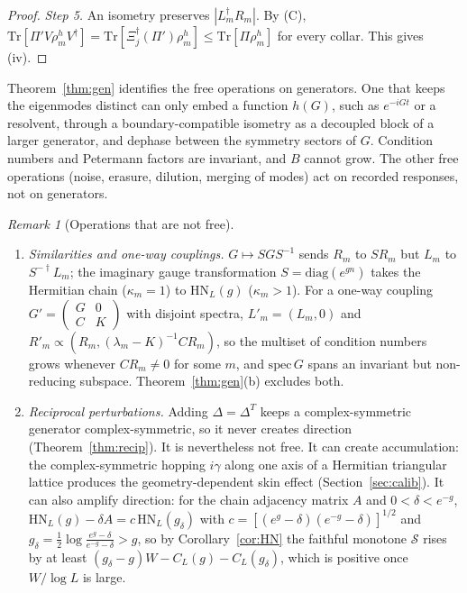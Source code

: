 \documentclass[11pt]{article}
\theoremstyle{definition}
\theoremstyle{remark}
\newtheorem{remark}{Remark}
\newcommand{\Tr}{\mathrm{Tr}}
\begin{document}
\begin{proof}
\emph{Step 5.} An isometry preserves $|L_m^\dagger R_m|$. By (C), $\Tr[\Pi'V\rho^h_mV^\dagger]=\Tr[\Xi_j^\dagger(\Pi')\rho^h_m]\le\Tr[\Pi\rho^h_m]$ for every collar. This gives (iv).
\end{proof}

Theorem~\ref{thm:gen} identifies the free operations on generators. One that keeps the eigenmodes distinct can only embed a function $h(G)$, such as $e^{-iGt}$ or a resolvent, through a boundary-compatible isometry as a decoupled block of a larger generator, and dephase between the symmetry sectors of $G$. Condition numbers and Petermann factors are invariant, and $B$ cannot grow. The other free operations (noise, erasure, dilution, merging of modes) act on recorded responses, not on generators.

\begin{remark}[Operations that are not free]\label{rem:notfree}
\leavevmode
\begin{enumerate}
\item[(a)] \emph{Similarities and one-way couplings.} $G\mapsto SGS^{-1}$ sends $R_m$ to $SR_m$ but $L_m$ to $S^{-\dagger}L_m$; the imaginary gauge transformation $S=\mathrm{diag}(e^{gn})$ takes the Hermitian chain ($\kappa_m=1$) to $\mathrm{HN}_L(g)$ ($\kappa_m>1$). For a one-way coupling $G'=\left(\begin{smallmatrix}G&0\\C&K\end{smallmatrix}\right)$ with disjoint spectra, $L'_m=(L_m,0)$ and $R'_m\propto(R_m,(\lambda_m-K)^{-1}CR_m)$, so the multiset of condition numbers grows whenever $CR_m\ne0$ for some $m$, and $\mathrm{spec}\,G$ spans an invariant but non-reducing subspace. Theorem~\ref{thm:gen}(b) excludes both.
\item[(b)] \emph{Reciprocal perturbations.} Adding $\Delta=\Delta^T$ keeps a complex-symmetric generator complex-symmetric, so it never creates direction (Theorem~\ref{thm:recip}). It is nevertheless not free. It can create accumulation: the complex-symmetric hopping $i\gamma$ along one axis of a Hermitian triangular lattice produces the geometry-dependent skin effect (Section~\ref{sec:calib}). It can also amplify direction: for the chain adjacency matrix $A$ and $0<\delta<e^{-g}$, $\mathrm{HN}_L(g)-\delta A=c\,\mathrm{HN}_L(g_\delta)$ with $c=[(e^g-\delta)(e^{-g}-\delta)]^{1/2}$ and $g_\delta=\frac12\log\frac{e^g-\delta}{e^{-g}-\delta}>g$, so by Corollary~\ref{cor:HN} the faithful monotone $\mathcal S$ rises by at least $(g_\delta-g)W-C_L(g)-C_L(g_\delta)$, which is positive once $W/\log L$ is large.

\end{enumerate}
\end{remark}
\end{document}
